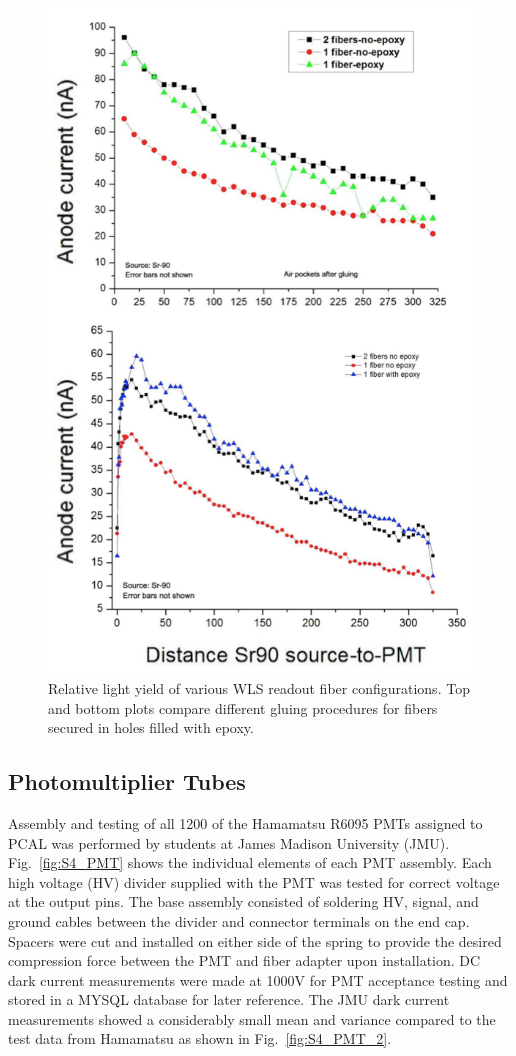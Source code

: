 \begin{figure}[hbt]
\centering
\includegraphics[width=0.85\columnwidth,keepaspectratio]{img/S4_4.png}
\caption{Relative light yield of various WLS readout fiber configurations.  Top and bottom plots compare different gluing procedures for fibers secured in holes filled with epoxy.}
\label{fig:S4_4}
\end{figure}

\subsection{Photomultiplier Tubes}
Assembly and testing of all 1200 of the Hamamatsu R6095 PMTs assigned to PCAL was performed by students at James Madison University (JMU). Fig.~\ref{fig:S4_PMT} shows the individual elements of each PMT assembly. Each high voltage (HV) divider supplied with the PMT was tested for correct voltage at the output pins. The base assembly consisted of soldering HV, signal, and ground cables between the divider and connector terminals on the end cap.  Spacers were cut and installed on either side of the spring to provide the desired compression force between the PMT and fiber adapter upon installation.  DC dark current measurements were made at 1000V for PMT acceptance testing and stored in a MYSQL database for later reference.  The  JMU dark current measurements showed a considerably small mean and variance compared to the test data from Hamamatsu as shown in Fig.~\ref{fig:S4_PMT_2}. 

